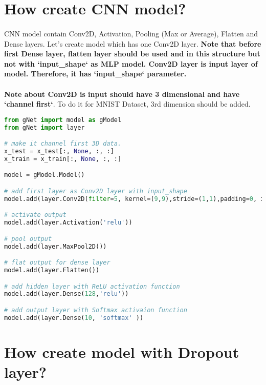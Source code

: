 \documentclass[12pt]{report}
\begin{document}
\section{How create CNN model?}
\paragraph{}
CNN model contain Conv2D, Activation, Pooling (Max or Average), Flatten and Dense layers. Let's create model which has one Conv2D layer. \textbf{Note that before first Dense layer, flatten layer should be used and in this structure but not with `input\_shape` as MLP model. Conv2D layer is input layer of model. Therefore, it has `input\_shape` parameter.}

\paragraph{}
\textbf{Note about Conv2D is input should have 3 dimensional and have `channel first`}. To do it for MNIST Dataset, 3rd dimension should be added.


\begin{lstlisting}[language=Python, numbers=none, caption={Create CNN model.}, label={ex:create-cnn-model}]
from gNet import model as gModel
from gNet import layer

# make it channel first 3D data.
x_test = x_test[:, None, :, :]
x_train = x_train[:, None, :, :]

model = gModel.Model()

# add first layer as Conv2D layer with input_shape
model.add(layer.Conv2D(filter=5, kernel=(9,9),stride=(1,1),padding=0, input_shape=x_train[0].shape, use_bias=True))

# activate output
model.add(layer.Activation('relu'))

# pool output
model.add(layer.MaxPool2D())

# flat output for dense layer
model.add(layer.Flatten())

# add hidden layer with ReLU activation function
model.add(layer.Dense(128,'relu'))

# add output layer with Softmax activaion function 
model.add(layer.Dense(10, 'softmax' ))

\end{lstlisting}



\section{How create model with Dropout layer?}
\end{document}
